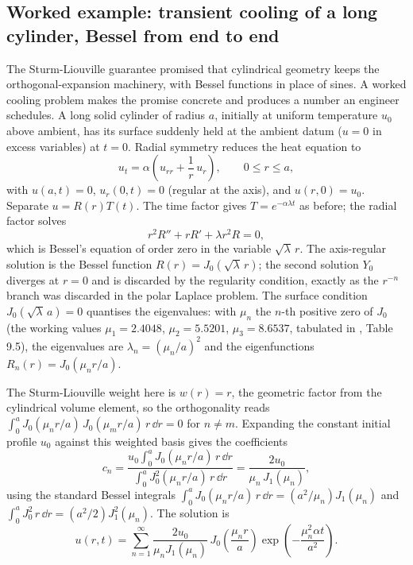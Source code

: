 \subsection{Worked example: transient cooling of a long cylinder, Bessel from end to end}

The Sturm-Liouville guarantee promised that cylindrical geometry
keeps the orthogonal-expansion machinery, with Bessel functions in
place of sines. A worked cooling problem makes the promise
concrete and produces a number an engineer schedules. A long solid
cylinder of radius $a$, initially at uniform temperature $u_{0}$
above ambient, has its surface suddenly held at the ambient datum
($u = 0$ in excess variables) at $t = 0$. Radial symmetry reduces
the heat equation to
\[
u_{t} = \alpha\left(u_{rr} + \frac{1}{r}\,u_{r}\right),
\qquad 0 \leq r \leq a,
\]
with $u(a, t) = 0$, $u_{r}(0, t) = 0$ (regular at the axis), and
$u(r, 0) = u_{0}$. Separate $u = R(r)T(t)$. The time factor gives
$T = e^{-\alpha\lambda t}$ as before; the radial factor solves
\[
r^{2}R'' + r R' + \lambda r^{2} R = 0,
\]
which is Bessel's equation of order zero in the variable
$\sqrt{\lambda}\,r$. The axis-regular solution is the Bessel
function $R(r) = J_{0}(\sqrt{\lambda}\,r)$; the second solution
$Y_{0}$ diverges at $r = 0$ and is discarded by the regularity
condition, exactly as the $r^{-n}$ branch was discarded in the
polar Laplace problem. The surface condition $J_{0}(\sqrt{\lambda}
\,a) = 0$ quantises the eigenvalues: with $\mu_{n}$ the $n$-th
positive zero of $J_{0}$ (the working values $\mu_{1} = 2.4048$,
$\mu_{2} = 5.5201$, $\mu_{3} = 8.6537$, tabulated in
\textcite{text:v2ch04-abramowitz-stegun-1972}, Table 9.5), the
eigenvalues are $\lambda_{n} = (\mu_{n}/a)^{2}$ and the
eigenfunctions $R_{n}(r) = J_{0}(\mu_{n} r/a)$.

The Sturm-Liouville weight here is $w(r) = r$, the geometric factor
from the cylindrical volume element, so the orthogonality reads
$\int_{0}^{a} J_{0}(\mu_{n} r/a)\, J_{0}(\mu_{m} r/a)\, r\,\dd r =
0$ for $n \neq m$. Expanding the constant initial profile $u_{0}$
against this weighted basis gives the coefficients
\[
c_{n} = \frac{u_{0}\int_{0}^{a} J_{0}(\mu_{n} r/a)\, r\,\dd r}
             {\int_{0}^{a} J_{0}^{2}(\mu_{n} r/a)\, r\,\dd r}
      = \frac{2 u_{0}}{\mu_{n}\, J_{1}(\mu_{n})},
\]
using the standard Bessel integrals $\int_{0}^{a} J_{0}(\mu_{n}
r/a)\, r\,\dd r = (a^{2}/\mu_{n})J_{1}(\mu_{n})$ and
$\int_{0}^{a} J_{0}^{2}\, r\,\dd r = (a^{2}/2)J_{1}^{2}(\mu_{n})$.
The solution is
\[
u(r, t) = \sum_{n=1}^{\infty} \frac{2 u_{0}}{\mu_{n} J_{1}(\mu_{n})}\,
          J_{0}\!\left(\frac{\mu_{n} r}{a}\right)
          \exp\!\left(-\frac{\mu_{n}^{2}\alpha t}{a^{2}}\right).
\]

